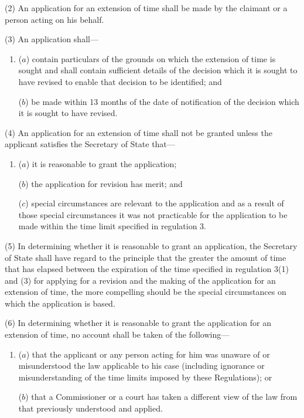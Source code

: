 \documentclass[12pt,a4paper]{article}
\begin{document}
(2) An application for an extension of time shall be made by the claimant or a person acting on his behalf.

(3) An application shall—
\begin{enumerate}\item[]
($a$) contain particulars of the grounds on which the extension of time is sought and shall contain sufficient details of the decision which it is sought to have revised to enable that decision to be identified; and

($b$) be made within 13 months of the date of notification of the decision which it is sought to have revised.
\end{enumerate}

(4) An application for an extension of time shall not be granted unless the applicant satisfies the Secretary of State that—
\begin{enumerate}\item[]
($a$) it is reasonable to grant the application;

($b$) the application for revision has merit; and

($c$) special circumstances are relevant to the application and as a result of those special circumstances it was not practicable for the application to be made within the time limit specified in regulation 3.
\end{enumerate}

(5) In determining whether it is reasonable to grant an application, the Secretary of State shall have regard to the principle that the greater the amount of time that has elapsed between the expiration of the time specified in regulation 3(1) and (3) for applying for a revision and the making of the application for an extension of time, the more compelling should be the special circumstances on which the application is based.

(6) In determining whether it is reasonable to grant the application for an extension of time, no account shall be taken of the following—
\begin{enumerate}\item[]
($a$) that the applicant or any person acting for him was unaware of or misunderstood the law applicable to his case (including ignorance or misunderstanding of the time limits imposed by these Regulations); or

($b$) that a Commissioner or a court has taken a different view of the law from that previously understood and applied.
\end{enumerate}
\end{document}
